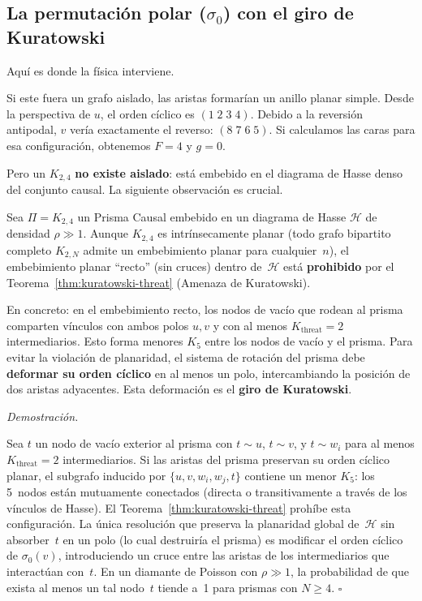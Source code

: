 \documentclass[11pt, a4paper, openany]{book}
\renewenvironment{proof}[1][Demostraci\'on]{%
  \par\noindent\textit{#1.}\quad
}{\hfill$\square$\par\medskip}
\begin{document}
\subsection{La permutación polar ($\sigma_0$) con el giro de Kuratowski}
\label{subsec:giro-kuratowski}

Aqu\'i es donde la f\'isica interviene.

Si este fuera un grafo aislado, las aristas formar\'ian
un anillo planar simple. Desde la perspectiva de $u$, el orden c\'iclico
es $(1\;2\;3\;4)$. Debido a la reversi\'on antipodal, $v$ ver\'ia
exactamente el reverso: $(8\;7\;6\;5)$. Si calculamos las caras
para esa configuraci\'on, obtenemos $F = 4$ y $g = 0$.

Pero un $K_{2,4}$ \textbf{no existe aislado}: est\'a embebido en el
diagrama de Hasse denso del conjunto causal. La siguiente observaci\'on
es crucial.

\begin{lemma}
\label{lem:ambient-nonplanarity}
Sea $\Pi = K_{2,4}$ un Prisma Causal embebido en un diagrama de Hasse
$\mathcal{H}$ de densidad $\rho \gg 1$. Aunque $K_{2,4}$ es
intr\'insecamente planar (todo grafo bipartito completo $K_{2,N}$ admite
un embebimiento planar para cualquier~$n$), el embebimiento planar
``recto'' (sin cruces) dentro de~$\mathcal{H}$ est\'a
\textbf{prohibido} por el Teorema~\ref{thm:kuratowski-threat} (Amenaza de
Kuratowski).

En concreto: en el embebimiento recto, los nodos de vac\'io que rodean
al prisma comparten v\'inculos con ambos polos $u, v$ y con al menos
$K_{\text{threat}} = 2$ intermediarios. Esto forma menores $K_5$
entre los nodos de vac\'io y el prisma. Para evitar la violaci\'on de
planaridad, el sistema de rotaci\'on del prisma debe \textbf{deformar
su orden c\'iclico} en al menos un polo, intercambiando la posici\'on
de dos aristas adyacentes. Esta deformaci\'on es el \textbf{giro de
Kuratowski}.
\end{lemma}

\begin{proof}
Sea $t$ un nodo de vac\'io exterior al prisma con $t \sim u$,
$t \sim v$, y $t \sim w_i$ para al menos $K_{\text{threat}} = 2$
intermediarios. Si las aristas del prisma preservan su orden c\'iclico
planar, el subgrafo inducido por $\{u, v, w_i, w_j, t\}$ contiene un
menor $K_5$: los 5~nodos est\'an mutuamente conectados (directa o
transitivamente a trav\'es de los v\'inculos de Hasse). El
Teorema~\ref{thm:kuratowski-threat} proh\'ibe esta configuraci\'on. La
\'unica resoluci\'on que preserva la planaridad global
de~$\mathcal{H}$ sin absorber~$t$ en un polo (lo cual destruir\'ia el
prisma) es modificar el orden c\'iclico de $\sigma_0(v)$,
introduciendo un cruce entre las aristas de los intermediarios que
interact\'uan con~$t$. En un diamante de Poisson con $\rho \gg 1$,
la probabilidad de que exista al menos un tal nodo~$t$ tiende a~1
para prismas con $N \geq 4$.
\end{proof}
\end{document}
